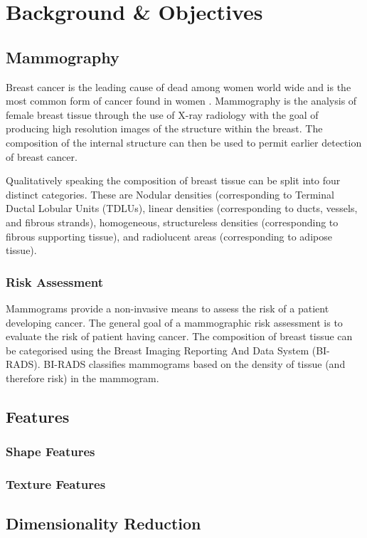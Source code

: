 \chapter{Background \& Objectives}

\section{Mammography}
Breast cancer is the leading cause of dead among women world wide and is the most common form of cancer found in women \cite{siegel2014cancer}. Mammography is the analysis of female breast tissue through the use of X-ray radiology with the goal of producing high resolution images of the structure within the breast. The composition of the internal structure can then be used to permit earlier detection of breast cancer.

Qualitatively speaking the composition of breast tissue can be split into four distinct categories. These are Nodular densities (corresponding to Terminal Ductal Lobular Units (TDLUs), linear densities (corresponding to ducts, vessels, and fibrous strands), homogeneous, structureless densities (corresponding to fibrous supporting tissue), and radiolucent areas (corresponding to adipose tissue).

\subsection{Risk Assessment}
Mammograms provide a non-invasive means to assess the risk of a patient developing cancer. The general goal of a mammographic risk assessment is to evaluate the risk of patient having cancer. The composition of breast tissue can be categorised using the Breast Imaging Reporting And Data System (BI-RADS)\cite{american1998breast}. BI-RADS classifies mammograms based on the density of tissue (and therefore risk) in the mammogram.

\section{Features}
\subsection{Shape Features}
\subsection{Texture Features}

\section{Dimensionality Reduction}
